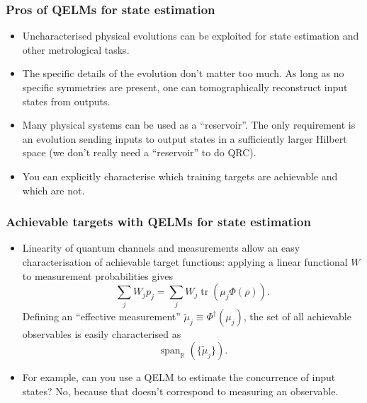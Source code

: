 \documentclass{beamer}
\begin{document}
\begin{frame}
\frametitle{Pros of QELMs for state estimation}

\begin{itemize}
    \item Uncharacterised physical evolutions can be exploited for state estimation and other metrological tasks.
    \item The specific details of the evolution don't matter too much. As long as no specific symmetries are present, one can tomographically reconstruct input states from outputs.
    \item Many physical systems can be used as a ``reservoir''. The only requirement is an evolution sending inputs to output states in a sufficiently larger Hilbert space (we don't really need a ``reservoir'' to do QRC).
    \item You can explicitly characterise which training targets are achievable and which are not.
\end{itemize}

\end{frame}



\begin{frame}
\frametitle{Achievable targets with QELMs for state estimation}

\begin{itemize}
    \item Linearity of quantum channels and measurements allow an easy characterisation of achievable target functions: applying a linear functional $W$ to measurement probabilities gives
    \begin{equation}
        \sum_j W_j p_j = \sum_j W_j \operatorname{tr}(\mu_j \Phi(\rho)).
    \end{equation}
    Defining an ``effective measurement'' $\tilde\mu_j\equiv \Phi^\dagger(\mu_j)$, the set of all achievable observables is easily characterised as
    \begin{equation}
        \operatorname{span}_{\mathbb{R}}(\{\tilde\mu_j\}).
    \end{equation}
    \item For example, can you use a QELM to estimate the concurrence of input states? No, because that doesn't correspond to measuring an observable.
\end{itemize}

\end{frame}
\end{document}
